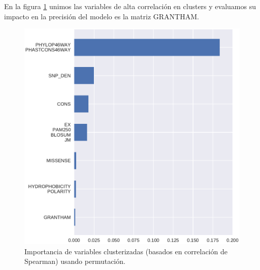En la figura \ref{fig:importance_cluster_integral} unimos las variables de alta correlación en clusters y evaluamos su impacto en la precisión del modelo es la matriz GRANTHAM.





\begin{figure}[H]
    \centering
    \includegraphics[scale=0.6]{documents/latex/figures/3/integral/integral_importance_cluster.pdf}
    \caption{Importancia de variables clusterizadas (basados en correlación de Spearman) usando permutación.}
    \label{fig:importance_cluster_integral}
\end{figure}

\newpage

